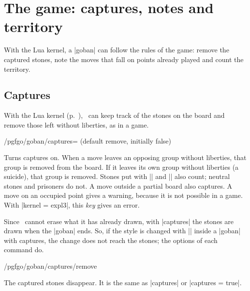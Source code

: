 \section{The game: captures, notes and territory}
\label{sec:juego}

With the Lua kernel, a |goban| can follow the rules of the game: remove the captured stones, note the moves that fall on points already played and count the territory.

	\subsection{Captures}
	\label{subsec:capturas}

	With the Lua kernel (p.~\pageref{subsec:kernel}), \pgfgoname\ can keep track of the stones on the board and remove those left without liberties, as in a game.

	\begin{key}{/pgfgo/goban/captures= (default remove, initially false)}

		Turns captures on. When a move leaves an opposing group without liberties, that group is removed from the board. If it leaves its own group without liberties (a suicide), that group is removed. Stones put with |\stone| and |\stones| also count; neutral stones and prisoners do not. A move outside a partial board also captures. A move on an occupied point gives a warning, because it is not possible in a game. With |kernel = expl3|, this \emph{key} gives an error.

		\begin{codeexample}[]

			\begin{goban}
			\end{goban}

			\begin{goban}[captures]
			\end{goban}
		\end{codeexample}

		Since \pgfname\ cannot erase what it has already drawn, with |captures| the stones are drawn when the |goban| ends. So, if the style is changed with |\pgfgoset| inside a |goban| with captures, the change does not reach the stones; the options of each command do.
	\end{key}

	\begin{stylekey}{/pgfgo/goban/captures/remove}

		The captured stones disappear. It is the same as |captures| or |captures = true|.
	\end{stylekey}

